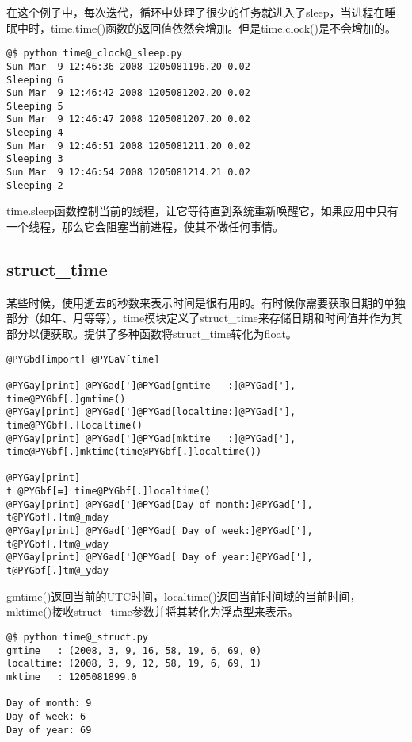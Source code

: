 \documentclass[letterpaper,10pt,english]{manual}
\begin{document}
在这个例子中，每次迭代，循环中处理了很少的任务就进入了sleep，当进程在睡眠中时，time.time()函数的返回值依然会增加。但是time.clock()是不会增加的。

\begin{Verbatim}[commandchars=@\[\]]
@$ python time@_clock@_sleep.py
Sun Mar  9 12:46:36 2008 1205081196.20 0.02
Sleeping 6
Sun Mar  9 12:46:42 2008 1205081202.20 0.02
Sleeping 5
Sun Mar  9 12:46:47 2008 1205081207.20 0.02
Sleeping 4
Sun Mar  9 12:46:51 2008 1205081211.20 0.02
Sleeping 3
Sun Mar  9 12:46:54 2008 1205081214.21 0.02
Sleeping 2
\end{Verbatim}

time.sleep函数控制当前的线程，让它等待直到系统重新唤醒它，如果应用中只有一个线程，那么它会阻塞当前进程，使其不做任何事情。


\subsection{struct\_time}

某些时候，使用逝去的秒数来表示时间是很有用的。有时候你需要获取日期的单独部分（如年、月等等），time模块定义了struct\_time来存储日期和时间值并作为其部分以便获取。提供了多种函数将struct\_time转化为float。

\begin{Verbatim}[commandchars=@\[\]]
@PYGbd[import] @PYGaV[time]

@PYGay[print] @PYGad[']@PYGad[gmtime   :]@PYGad['], time@PYGbf[.]gmtime()
@PYGay[print] @PYGad[']@PYGad[localtime:]@PYGad['], time@PYGbf[.]localtime()
@PYGay[print] @PYGad[']@PYGad[mktime   :]@PYGad['], time@PYGbf[.]mktime(time@PYGbf[.]localtime())

@PYGay[print]
t @PYGbf[=] time@PYGbf[.]localtime()
@PYGay[print] @PYGad[']@PYGad[Day of month:]@PYGad['], t@PYGbf[.]tm@_mday
@PYGay[print] @PYGad[']@PYGad[ Day of week:]@PYGad['], t@PYGbf[.]tm@_wday
@PYGay[print] @PYGad[']@PYGad[ Day of year:]@PYGad['], t@PYGbf[.]tm@_yday
\end{Verbatim}

gmtime()返回当前的UTC时间，localtime()返回当前时间域的当前时间，mktime()接收struct\_time参数并将其转化为浮点型来表示。

\begin{Verbatim}[commandchars=@\[\]]
@$ python time@_struct.py
gmtime   : (2008, 3, 9, 16, 58, 19, 6, 69, 0)
localtime: (2008, 3, 9, 12, 58, 19, 6, 69, 1)
mktime   : 1205081899.0

Day of month: 9
Day of week: 6
Day of year: 69
\end{Verbatim}
\end{document}
